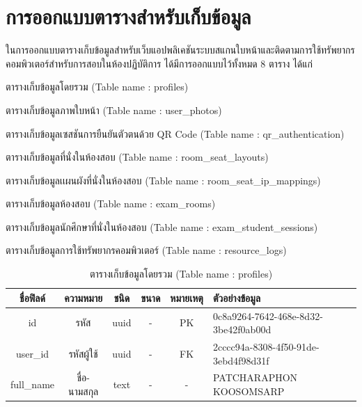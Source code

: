 \section{การออกแบบตารางสำหรับเก็บข้อมูล}
\hspace*{1.3em} %
ในการออกแบบตารางเก็บข้อมูลสำหรับเว็บแอปพลิเคชันระบบสแกนใบหน้าและติดตามการใช้ทรัพยากรคอมพิวเตอร์สำหรับการสอบในห้องปฏิบัติการ ได้มีการออกแบบไว้ทั้งหมด 8 ตาราง ได้แก่ 

\begin{mycustomenum2}
    \item ตารางเก็บข้อมูลโดยรวม (Table name : profiles)
    \item ตารางเก็บข้อมูลภาพใบหน้า (Table name : user\_photos)
    \item ตารางเก็บข้อมูลเซสชันการยืนยันตัวตนด้วย QR Code (Table name : qr\_authentication)
    \item ตารางเก็บข้อมูลที่นั่งในห้องสอบ (Table name : room\_seat\_layouts)
    \item ตารางเก็บข้อมูลเเผนผังที่นั่งในห้องสอบ (Table name : room\_seat\_ip\_mappings)
    \item ตารางเก็บข้อมูลห้องสอบ (Table name : exam\_rooms)
    \item ตารางเก็บข้อมูลนักศึกษาที่นั่งในห้องสอบ (Table name : exam\_student\_sessions)
    \item ตารางเก็บข้อมูลการใช้ทรัพยากรคอมพิวเตอร์ (Table name : resource\_logs)
\end{mycustomenum2}


\begin{table}[h!]
    \centering
    \caption{\fontSixTeen ตารางเก็บข้อมูลโดยรวม (Table name : profiles)}
    \label{tab3:profiles}
    \fontSixTeen 
    \begin{tabularx}{\textwidth}{| c | c | c | c | c | X |} 
    \hline
    \textbf{ชื่อฟิลด์} & \textbf{ความหมาย} & \textbf{ชนิด} & \textbf{ขนาด} & \textbf{หมายเหตุ} & \textbf{ตัวอย่างข้อมูล} \\
    \hline
    id & รหัส & uuid & - & PK & 0c8a9264-7642-468e-8d32-3be42f0ab00d \\
    \hline
    user\_id & รหัสผู้ใช้ & uuid & - & FK & 2cccc94a-8308-4f50-91de-3ebd4f98d31f \\
    \hline
    full\_name & ชื่อ-นามสกุล & text & - & - & PATCHARAPHON KOOSOMSARP \\
    \hline
    \end{tabularx}
\end{table}


